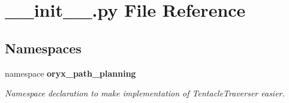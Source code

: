 \section{\-\_\-\-\_\-init\-\_\-\-\_\-.\-py \-File \-Reference}
\label{____init_____8py}
\subsection*{\-Namespaces}
\begin{DoxyCompactItemize}
\item 
namespace {\bf oryx\-\_\-path\-\_\-planning}
\begin{DoxyCompactList}\small\item\em \-Namespace declaration to make implementation of \-Tentacle\-Traverser easier. \end{DoxyCompactList}\end{DoxyCompactItemize}
